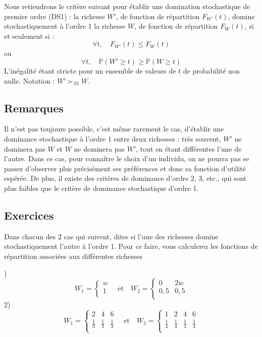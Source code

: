 \documentclass[a4paper, 12pt]{report}
\begin{document}
Nous retiendrons le critère suivant pour établir une domination stochastique de premier ordre (DS1) : la richesse \( W' \), de fonction de répartition \( F_{W'}(t) \), domine stochastiquement à l'ordre 1 la richesse \( W \), de fonction de répartition \( F_{W}(t) \), si et seulement si : 
\[
\forall t, \quad F_{W'}(t) \leq F_{W}(t)
\]
ou 
\[
\forall t, \quad \mathbb{P}(W' \geq t) \geq \mathbb{P}(W \geq t)
\]
L'inégalité étant stricte pour un ensemble de valeurs de \( t \) de probabilité non nulle. 
Notation : \( W' \succ_{S1} W \).

\subsection{Remarques}

Il n'est pas toujours possible, c'est même rarement le cas, d'établir une dominance stochastique à l'ordre 1 entre deux richesses : très souvent, \( W' \) ne dominera pas \( W \) et \( W \) ne dominera pas \( W' \), tout en étant différentes l'une de l'autre. Dans ce cas, pour connaître le choix d'un individu, on ne pourra pas se passer d'observer plus précisément ses préférences et donc sa fonction d'utilité espérée. De plus, il existe des critères de dominance d'ordre 2, 3, etc., qui sont plus faibles que le critère de dominance stochastique d'ordre 1.

\subsection{Exercices}

Dans chacun des 2 cas qui suivent, dites si l'une des richesses domine stochastiquement l'autre à l'ordre 1. Pour ce faire, vous calculerez les fonctions de répartition associées aux différentes richesses

)
\[ 
W_1 = \left\{\begin{matrix}
	w\\
	1 \\
\end{matrix}\right. \quad \text{et}\quad W_2=
\left\{\begin{matrix}
	0 & 2w \\
	0,5 & 0,5\\
\end{matrix}\right. 
 \]
2)
\[ 
W_1 = \left\{\begin{matrix}
	2 & 4 & 6\\
	\frac{1}{3} & \frac{1}{3} & \frac{1}{3}\\
\end{matrix}\right. \quad \text{et}\quad W_2=
\left\{\begin{matrix}
	1 & 2 & 4 & 6\\
	\frac{1}{4} & \frac{1}{4} & \frac{1}{4} & \frac{1}{4}\\
\end{matrix}\right. 
 \]
\end{document}
